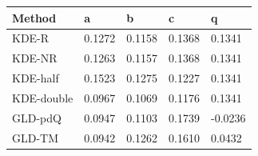 \begin{tabular}{lllll}
\toprule
Method & a & b & c & q \\
\midrule
KDE-R & 0.1272 & 0.1158 & 0.1368 & 0.1341 \\
KDE-NR & 0.1263 & 0.1157 & 0.1368 & 0.1341 \\
KDE-half & 0.1523 & 0.1275 & 0.1227 & 0.1341 \\
KDE-double & 0.0967 & 0.1069 & 0.1176 & 0.1341 \\
GLD-pdQ & 0.0947 & 0.1103 & 0.1739 & -0.0236 \\
GLD-TM & 0.0942 & 0.1262 & 0.1610 & 0.0432 \\
\bottomrule
\end{tabular}
